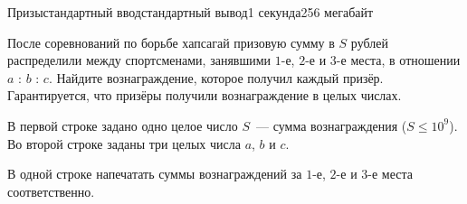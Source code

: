 \begin{problem}{Призы}{стандартный ввод}{стандартный вывод}{1 секунда}{256 мегабайт}

После соревнований по борьбе хапсагай призовую сумму в $S$ рублей распределили между спортсменами, занявшими $1$-е, $2$-е и $3$-е места, в отношении $a$ : $b$ : $c$. Найдите вознаграждение, которое получил каждый призёр. Гарантируется, что призёры получили вознаграждение в целых числах.


\InputFile
В первой строке задано одно целое число $S$~--- сумма вознаграждения ($S \le 10^9$). Во второй строке заданы три целых числа $a$, $b$ и $c$.


\OutputFile
В одной строке напечатать суммы вознаграждений за $1$-е, $2$-е и $3$-е места соответственно.


\Example

\begin{example}
%
\end{example}

\end{problem}

